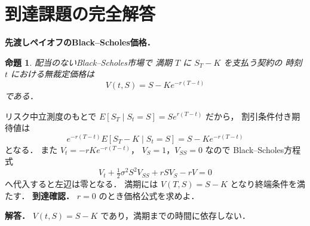 \documentclass[a5paper,10pt,onecolumn]{jsarticle}
\makeatletter
\theoremstyle{mathnotetheorem}
\newtheorem{proposition}[theorem]{命題}
\renewcommand{\proofname}{証明}
\renewenvironment{proof}[1][\proofname]{%
  \par\pushQED{\qed}\normalfont\topsep4\p@\@plus2\p@\relax
  \trivlist\item[\hskip\labelsep\bfseries #1]\ignorespaces
}{\popQED\endtrivlist\@endpefalse}
\makeatother
\begin{document}
\section{到達課題の完全解答}
\noindent\textbf{先渡しペイオフのBlack--Scholes価格．}
\begin{proposition}
配当のないBlack--Scholes市場で
満期 $T$ に $S_T-K$ を支払う契約の
時刻 $t$ における無裁定価格は
\[
V(t,S)=S-Ke^{-r(T-t)}
\]
である．
\end{proposition}
\begin{proof}
リスク中立測度のもとで
$E[S_T\mid S_t=S]=Se^{r(T-t)}$ だから，
割引条件付き期待値は
\[
e^{-r(T-t)}E[S_T-K\mid S_t=S]
=S-Ke^{-r(T-t)}
\]
となる．
また $V_t=-rKe^{-r(T-t)}$，
$V_S=1$，$V_{SS}=0$ なので
Black--Scholes方程式
\[
V_t+\tfrac12\sigma^2S^2V_{SS}
+rSV_S-rV=0
\]
へ代入すると左辺は零となる．
満期には $V(T,S)=S-K$ となり終端条件を満たす．
\end{proof}
\noindent\textbf{到達確認．}
$r=0$ のとき価格公式を求めよ．
\par\noindent\textbf{解答．}
$V(t,S)=S-K$ であり，満期までの時間に依存しない．
\end{document}
